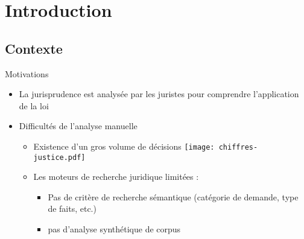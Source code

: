 \section{Introduction}

\subsection{Contexte}
\begin{frame}[t]{\mysubsectiontitle}
	Motivations
	\begin{itemize}
		\item La jurisprudence est analysée par les juristes pour comprendre l'application de la loi 
	    \item Difficultés de l'analyse manuelle
	    \begin{itemize}
	    	\item Existence d'un gros volume de décisions 
	    		\texttt{[image: chiffres-justice.pdf]}   	
			\item Les moteurs de recherche juridique limitées : 
			\begin{itemize}
				\item Pas de critère de recherche sémantique (catégorie de demande, type de faits, etc.)
				\item pas d'analyse synthétique de corpus
			\end{itemize}
	    \end{itemize}
	\end{itemize}
\end{frame}

